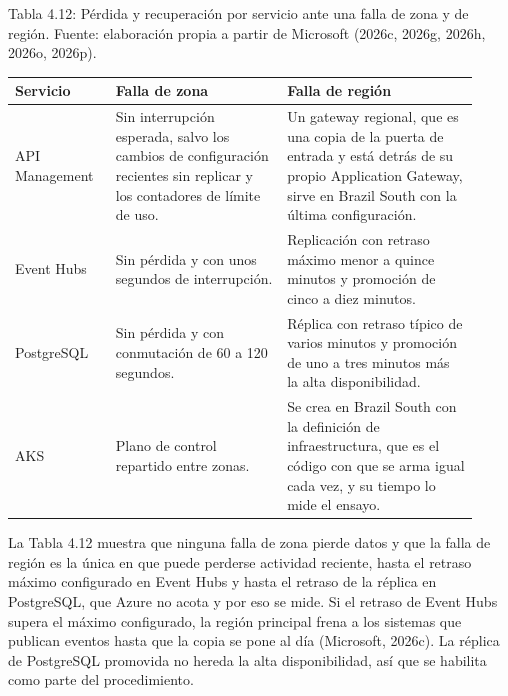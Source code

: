 \documentclass[11pt]{article}
\begin{document}
\par\vspace{0pt plus 10\baselineskip}\vspace{0pt plus -10\baselineskip}

Tabla 4.12: Pérdida y recuperación por servicio ante una falla de zona y de región. Fuente: elaboración propia a partir de Microsoft (2026c, 2026g, 2026h, 2026o, 2026p).\par\nopagebreak
\begin{longtable}{@{}p{0.20\linewidth}p{0.34\linewidth}p{0.38\linewidth}@{}}
\toprule Servicio & Falla de zona & Falla de región \\
\midrule\endhead\bottomrule\endlastfoot
API Management & Sin interrupción esperada, salvo los cambios de configuración recientes sin replicar y los contadores de límite de uso. & Un gateway regional, que es una copia de la puerta de entrada y está detrás de su propio Application Gateway, sirve en Brazil South con la última configuración. \\
Event Hubs & Sin pérdida y con unos segundos de interrupción. & Replicación con retraso máximo menor a quince minutos y promoción de cinco a diez minutos. \\
PostgreSQL & Sin pérdida y con conmutación de 60 a 120 segundos. & Réplica con retraso típico de varios minutos y promoción de uno a tres minutos más la alta disponibilidad. \\
AKS & Plano de control repartido entre zonas. & Se crea en Brazil South con la definición de infraestructura, que es el código con que se arma igual cada vez, y su tiempo lo mide el ensayo. \\
\end{longtable}

La Tabla 4.12 muestra que ninguna falla de zona pierde datos y que la falla de región es la única en que puede perderse actividad reciente, hasta el retraso máximo configurado en Event Hubs y hasta el retraso de la réplica en PostgreSQL, que Azure no acota y por eso se mide. Si el retraso de Event Hubs supera el máximo configurado, la región principal frena a los sistemas que publican eventos hasta que la copia se pone al día (Microsoft, 2026c). La réplica de PostgreSQL promovida no hereda la alta disponibilidad, así que se habilita como parte del procedimiento.
\end{document}
